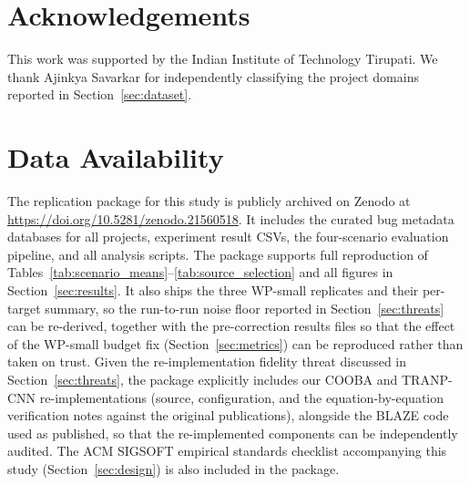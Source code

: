 \documentclass[a4paper,fleqn]{cas-dc}
\begin{document}
\section*{Acknowledgements}
This work was supported by the Indian Institute of Technology Tirupati.
We thank Ajinkya Savarkar for independently classifying the project domains
reported in Section~\ref{sec:dataset}.

\section*{Data Availability}

The replication package for this study is publicly archived on Zenodo at
\url{https://doi.org/10.5281/zenodo.21560518}.
It includes the curated bug metadata databases for all projects, experiment result CSVs, the four-scenario evaluation pipeline, and all analysis scripts. The package supports full reproduction of Tables~\ref{tab:scenario_means}--\ref{tab:source_selection}
and all figures in Section~\ref{sec:results}. It also ships the three WP-small
replicates and their per-target summary, so the run-to-run noise floor reported
in Section~\ref{sec:threats} can be re-derived, together with the
pre-correction results files so that the effect of the WP-small budget fix
(Section~\ref{sec:metrics}) can be reproduced rather than taken on trust. Given the re-implementation
fidelity threat discussed in Section~\ref{sec:threats}, the package explicitly
includes our COOBA and TRANP-CNN re-implementations (source, configuration,
and the equation-by-equation verification notes against the original
publications), alongside the BLAZE code used as published, so that the
re-implemented components can be independently audited. The ACM SIGSOFT
empirical standards checklist accompanying this study (Section~\ref{sec:design})
is also included in the package.



\end{document}
